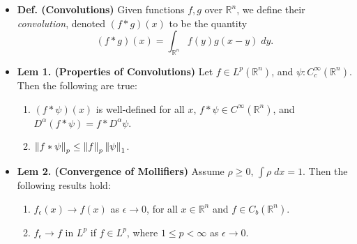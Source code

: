 \documentclass{article}
\begin{document}
\begin{itemize}
	\begin{solutions}
		Let $1 \leq p < \infty$, and fix $f \in L^{p}(\mathbb{R}^{n})$. We note that 
		\begin{equation}
			\int_{|x|\geq R}|f(x)|^{p}\;dx = \int_{\mathbb{R}^{n}}|f(x)|^{p}\chi_{\{|x| \geq R\}}\;dx. 
		\end{equation}
	Note that $|f(x)|^{p}\chi_{\{|x| \geq R\}} \leq |f(x)|^{p}$, $|f(x)|^{p}\chi_{\{|x| \geq R\}} \to 0$ pointwise, and $|f(x)|^{p} \in L^{1}$ (since $f\in L^{p}$). By the Dominated Convergence Theorem, we conclude that 
		\begin{equation}
			\int_{|x|\geq R}|f(x)|^{p}\;dx = \int_{\mathbb{R}^{n}}|f(x)|^{p}\chi_{\{|x| \geq R\}}\;dx \longrightarrow 0. 
		\end{equation} 
	\end{solutions} 
	
	\item \textbf{Def. (Convolutions)} Given functions $f, g$ over $\mathbb{R}^{n}$, we define their \textit{convolution}, denoted $(f \ast g)(x)$ to be the quantity 
		\begin{equation}
			(f \ast g)(x) = \int_{\mathbb{R}^{n}}f(y)g(x-y)\;dy.
		\end{equation}
		
	\item \textbf{Lem 1. (Properties of Convolutions)} Let $f \in L^{p}(\mathbb{R}^{n})$, and $\psi: C_{c}^{\infty}(\mathbb{R}^{n})$. Then the following are true: \vspace{-0.15cm}
		\begin{enumerate}[itemsep =-2pt,label = (\arabic{*})]
			\item $(f \ast \psi)(x)$ is well-defined for all $x$, $f \ast \psi \in C^{\infty}(\mathbb{R}^{n})$, and $D^{\alpha}(f \ast \psi) = f \ast D^{\alpha}\psi$. 
			\item $\left\Vert f \ast \psi \right\Vert_{p} \leq \left\Vert f \right\Vert_{p}\left\Vert \psi \right\Vert_{1}$. 
		\end{enumerate}
	\item \textbf{Lem 2. (Convergence of Mollifiers)} Assume $\rho \geq 0$, $\int \rho \;dx =  1$. Then the following results hold: \vspace{-0.25cm} 
	\begin{enumerate}[itemsep =-2pt,label = (\arabic{*})]
		\item $f_{\epsilon}(x) \to f(x)$ as $\epsilon \to 0$, for all $x \in \mathbb{R}^{n}$ and $f \in C_{b}(\mathbb{R}^{n})$. 
		\item $f_{\epsilon} \to f$ in $L^{p}$ if $f \in L^{p}$, where $1 \leq p < \infty$ as $\epsilon \to 0$. 
	\end{enumerate}
	

\end{itemize}
\end{document}
